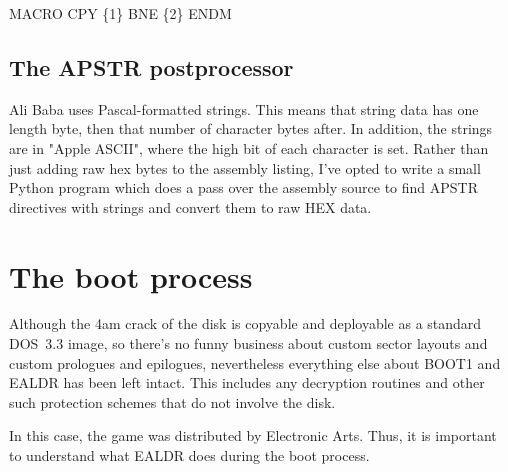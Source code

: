 \documentclass[10pt]{report}
\begin{document}
    MACRO 
        CPY     \{1\}
        BNE     \{2\}
    ENDM
\eatline
{}\nwendcode{}\nwdocspar

\section{The APSTR postprocessor}

Ali Baba uses Pascal-formatted strings. This means that string data has one length byte, then that number
of character bytes after. In addition, the strings are in "Apple ASCII", where the high bit of each
character is set. Rather than just adding raw hex bytes to the assembly listing, I've opted to write
a small Python program which does a pass over the assembly source to find {\Tt{}APSTR\nwendquote} directives with strings
and convert them to raw {\Tt{}HEX\nwendquote} data.

\chapter{The boot process}

Although the 4am crack of the disk is copyable and deployable as a standard
{\Tt{}DOS\ 3.3\nwendquote} image, so there's no funny business about custom sector layouts and
custom prologues and epilogues, nevertheless everything else about {\Tt{}BOOT1\nwendquote}
and {\Tt{}EALDR\nwendquote} has been left intact. This includes any decryption routines and
other such protection schemes that do not involve the disk.

In this case, the game was distributed by Electronic Arts.
Thus, it is important to understand what {\Tt{}EALDR\nwendquote} does during the boot process.
\end{document}
